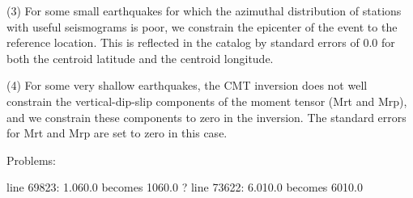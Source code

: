 (3) For some small earthquakes for which the azimuthal distribution of stations 
with useful seismograms is poor, we constrain the epicenter of the event to
the reference location. This is reflected in the catalog by standard 
errors of 0.0 for both the centroid latitude and the centroid longitude.

(4) For some very shallow earthquakes, the CMT inversion does not well 
constrain the vertical-dip-slip components of the moment tensor (Mrt and Mrp),
and we constrain these components to zero in the inversion. The standard
errors for Mrt and Mrp are set to zero in this case.


Problems:

line 69823: 1.060.0 becomes 1060.0 ?
line 73622: 6.010.0 becomes 6010.0 

 
